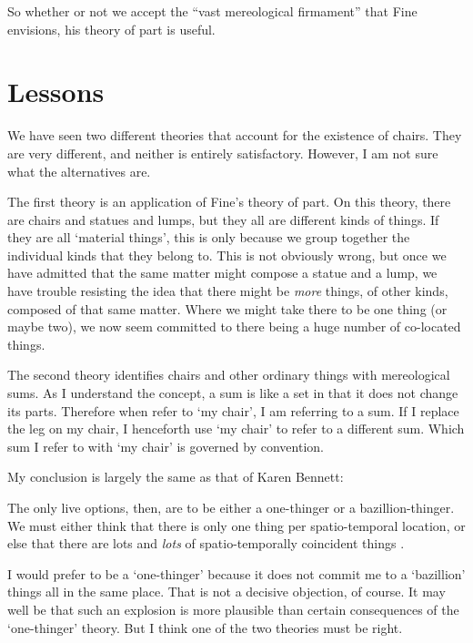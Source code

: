 \documentclass[11pt]{article}
\newenvironment{squote}{%
\begin{spacing}{1}
\begin{list}{}{%
\setlength{\labelwidth}{0pt}%
\rightmargin\leftmargin%
}
\item\relax
}{%
\end{list}%
\end{spacing}
}
\begin{document}
\begin{spacing}{1.5}
So whether or not we accept the ``vast mereological firmament'' that
Fine envisions, his theory of part is useful.


\section{Lessons}
\label{lessons-p}
We have seen two different theories that account for the existence of
chairs.  They are very different, and neither is entirely
satisfactory.  However, I am not sure what the alternatives are.

The first theory is an application of Fine's theory of part.  On this
theory, there are chairs and statues and lumps, but they all are
different kinds of things.  If they are all `material things', this is
only because we group together the individual kinds that they belong
to.  This is not obviously wrong, but once we have admitted that the
same matter might compose a statue and a lump, we have trouble
resisting the idea that there might be {\em more} things, of other
kinds, composed of that same matter.  Where we might take there to be
one thing (or maybe two), we now seem committed to there being a huge
number of co-located things.

The second theory identifies chairs and other ordinary things with
mereological sums.  As I understand the concept, a sum is like a set
in that it does not change its parts.  Therefore when refer to `my
chair', I am referring to a sum.  If I replace the leg on my chair, I
henceforth use `my chair' to refer to a different sum.  Which sum I
refer to with `my chair' is governed by convention.

My conclusion is largely the same as that of Karen Bennett:

\begin{squote}
The only live options, then, are to be either a one-thinger or a
bazillion-thinger.  We must either think that there is only one thing per
spatio-temporal location, or else that there are lots and \emph{lots} of
spatio-temporally coincident things \citeyearpar[358]{bennett2004}.
\end{squote}

I would prefer to be a `one-thinger' because it does not commit me to
a `bazillion' things all in the same place.  That is not a decisive
objection, of course.  It may well be that such an explosion is more
plausible than certain consequences of the `one-thinger' theory.  But
I think one of the two theories must be right.


\end{spacing}
\end{document}
